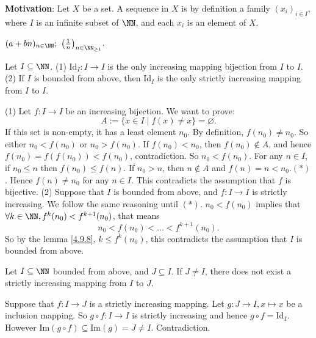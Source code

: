 \textbf{Motivation}: Let $X$ be a set. A sequence in $X$ is by definition a family $(x_i)_{i\in I}$,  where $I$ is an infinite subset of $\NN$,  and each $x_i$ is an element of $X$.
\begin{exampleenv}
    $(a+bn)_{n\in \NN};\ \left(\frac{1}{n}\right)_{n\in \NN_{\ge 1}}$.
\end{exampleenv}
\begin{propositionenv}
    Let $I\subseteq \NN$.
    \newline
    (1) $\mathrm{Id}_I:I\rightarrow I$ is the only increasing mapping bijection from $I$ to $I$.
    \newline
    (2) If $I$ is bounded from above,  then $\mathrm{Id}_I$ is the only strictly increasing mapping from $I$ to $I$.
\end{propositionenv}
\begin{proofenv}
    \quad
    \newline
    (1) Let $f:I\rightarrow I$ be an increasing bijection. We want to prove:
    $$A:=\{x\in I\mid f(x)\not=x\}=\varnothing.$$
    If this set is non-empty,  it has a least element $n_0$. By definition,  $f(n_0)\not=n_0$. So either $n_0<f(n_0)$ or $n_0>f(n_0)$.
    \newline
    If $f(n_0)<n_0$,  then $f(n_0)\notin A$,  and hence $f(n_0)=f(f(n_0))<f(n_0)$, contradiction. So $n_0<f(n_0)$.
    For any $n\in I$,  if $n_0\le n$ then $f(n_0)\le f(n)$. If $n_0>n$,  then $n\notin A$ and $f(n)=n<n_0$.$(*)$.
    Hence $f(n)\neq n_0$ for any $n\in I$. This contradicts the assumption that $f$ is bijective.
    \newline
    (2) Suppose that $I$ is bounded from above,  and $f:I\rightarrow I$ is strictly increasing. We follow the same reasoning until $(*)$. $n_0<f(n_0)$ implies that $\forall k \in \NN,  f^k(n_0)<f^{k+1}(n_0)$,  that means 
    $$n_0<f(n_0)<\dots <f^{k+1}(n_0).$$
    So by the lemma \ref{4.9.8},  $k\le f^k(n_0)$,  this contradicts the assumption that $I$ is bounded from above.
\end{proofenv}
\begin{corollaryenv}
    Let $I\subseteq \NN$ bounded from above, and $J\subseteq I$. If $J\not=I$,  there does not exist a strictly increasing mapping from $I$ to $J$.
\end{corollaryenv}
\begin{proofenv}
    Suppose that $f:I\rightarrow J$ is a strictly increasing mapping. Let $g:J\rightarrow I, x\mapsto x$ be a inclusion mapping. So $g\circ f:I\rightarrow I$ is strictly increasing and hence $g\circ f=\mathrm{Id}_I$. However $\mathrm{Im}(g\circ f)\subseteq\mathrm{Im}(g)=J\not=I$. Contradiction.
\end{proofenv}
